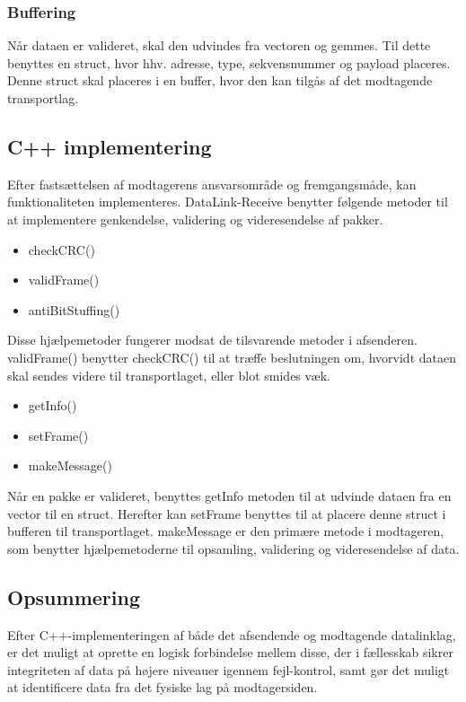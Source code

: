 \subsubsection{Buffering}
Når dataen er valideret, skal den udvindes fra vectoren og gemmes. Til dette benyttes en struct, hvor hhv. adresse, type, sekvensnummer og payload placeres. Denne struct skal placeres i en buffer, hvor den kan tilgås af det modtagende transportlag.

\subsection{C++ implementering}
Efter fastsættelsen af modtagerens ansvarsområde og fremgangsmåde, kan funktionaliteten implementeres.
	DataLink-Receive benytter følgende metoder til at implementere genkendelse, validering og videresendelse af pakker.

\begin{itemize}[noitemsep]
  \item checkCRC()
  \item validFrame()
  \item antiBitStuffing()
  \end{itemize}
Disse hjælpemetoder fungerer modsat de tilsvarende metoder i afsenderen. validFrame() benytter checkCRC() til at træffe beslutningen om, hvorvidt dataen skal sendes videre til transportlaget, eller blot smides væk.

\begin{itemize}[noitemsep]
  \item getInfo()
  \item setFrame()
  \item makeMessage()
  \end{itemize}
  
Når en pakke er valideret, benyttes getInfo metoden til at udvinde dataen fra en vector til en struct. Herefter kan setFrame benyttes til at placere denne struct i bufferen til transportlaget.
makeMessage er den primære metode i modtageren, som benytter hjælpemetoderne til opsamling, validering og videresendelse af data.

\subsection{Opsummering}
Efter C++-implementeringen af både det afsendende og modtagende datalinklag, er det muligt at oprette en logisk forbindelse mellem disse, der i fællesskab sikrer integriteten af data på højere niveauer igennem fejl-kontrol, samt gør det muligt at identificere data fra det fysiske lag på modtagersiden.

